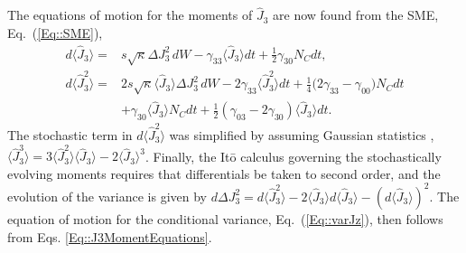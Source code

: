\documentclass[preprint, aps,pra,onecolumn]{revtex4-1} %
\newcommand{\erf}[1]{Eq.~(\ref{#1})}
\newcommand{\expt}[1]{\langle{#1}\rangle}
\newcommand{\smallfrac}[2]{\mbox{$\frac{#1}{#2}$}}
\newcommand{\varz}{\Delta J_3^2}
\newcommand{\jz}{\hat{J}_3}
\begin{document}
\begin{appendix}
The equations of motion for the moments of $\jz$ are now found from the SME, \erf{Eq::SME},
	\begin{subequations} \label{Eq::J3MomentEquations}
	\begin{align} 
		d \expt{\jz} =& s \sqrt{\kappa} \varz \, dW - \gamma_{33} \expt{\jz}dt + \smallfrac{1}{2} \gamma_{30} N_C dt ,  \\
		d \expt{\jz^2} =& 2 s\sqrt{\kappa} \expt{\jz}\Delta J_3^2 \, dW - 2 \gamma_{33} \expt{\jz^2}dt + \smallfrac{1}{4} \big( 2 \gamma_{33}-\gamma_{00}\big) N_C dt \\
		&+ \gamma_{30} \expt{\jz} N_C dt + \smallfrac{1}{2}\left(\gamma_{03} -2 \gamma_{30}\right) \expt{\jz} dt. \nonumber 
	\end{align}
	\end{subequations}
The stochastic term in $d\expt{\jz^2}$ was simplified by assuming Gaussian statistics \cite{jacobs_straightforward_2006}, $\expt{\jz^3} = 3\expt{\jz^2}\expt{\jz}- 2\expt{\jz}^3$. 
Finally, the It\={o} calculus governing the stochastically evolving moments requires that differentials be taken to second order, and the evolution of the variance is given by $d \varz = d \expt{\jz^2} - 2 \expt{\jz} d \expt{\jz} - ( d \expt{\jz} )^2$. 
The equation of motion for the conditional variance, \erf{Eq::varJz}, then follows from Eqs. \eqref{Eq::J3MomentEquations}.



\end{appendix}
\end{document}
